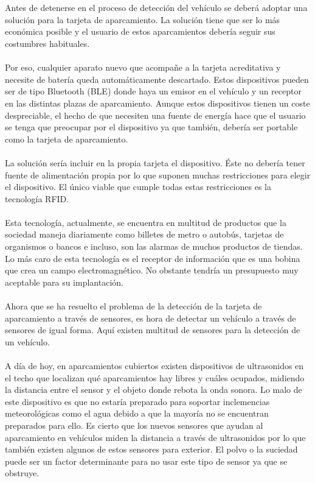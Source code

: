 \\\\
Antes de detenerse en el proceso de detección del vehículo se deberá adoptar una solución para la tarjeta de aparcamiento. La solución tiene que ser lo más económica posible y el usuario de estos aparcamientos debería seguir sus costumbres habituales.
\\\\
Por eso, cualquier aparato nuevo que acompañe a la tarjeta acreditativa y necesite de batería queda automáticamente descartado. Estos dispositivos pueden ser de tipo Bluetooth (BLE) donde haya un emisor en el vehículo y un receptor en las distintas plazas de aparcamiento. Aunque estos dispositivos tienen un coste despreciable, el hecho de que necesiten una fuente de energía hace que el usuario se tenga que preocupar por el dispositivo ya que también, debería ser portable como la tarjeta de aparcamiento.
\\\\
La solución sería incluir en la propia tarjeta el dispositivo. Éste no debería tener fuente de alimentación propia por lo que suponen muchas restricciones para elegir el dispositivo. El único viable que cumple todas estas restricciones es la tecnología RFID. 
\\\\
Esta tecnología, actualmente, se encuentra en multitud de productos que la sociedad maneja diariamente como billetes de metro o autobús, tarjetas de organismos o bancos e incluso, son las alarmas de muchos productos de tiendas. Lo más caro de esta tecnología es el receptor de información que es una bobina que crea un campo electromagnético. No obstante tendría un presupuesto muy aceptable para su implantación.
\\\\
Ahora que se ha resuelto el problema de la detección de la tarjeta de aparcamiento a través de sensores, es hora de detectar un vehículo a través de sensores de igual forma. Aquí existen multitud de sensores para la detección de un vehículo.
\\\\
A día de hoy, en aparcamientos cubiertos existen dispositivos de ultrasonidos en el techo que localizan qué aparcamientos hay libres y cuáles ocupados, midiendo la distancia entre el sensor y el objeto donde rebota la onda sonora. Lo malo de este dispositivo es que no estaría preparado para soportar inclemencias meteorológicas como el agua debido a que la mayoría no se encuentran preparados para ello. Es cierto que los nuevos sensores que ayudan al aparcamiento en vehículos miden la distancia a través de ultrasonidos por lo que también existen algunos de estos sensores para exterior. El polvo o la suciedad puede ser un factor determinante para no usar este tipo de sensor ya que se obstruye.
